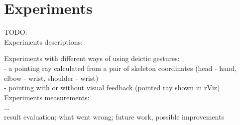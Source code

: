 \chapter{Experiments}
TODO:\\
Experiments descriptions:

Experiments with different ways of using deictic gestures:\\
- a pointing ray calculated from a pair of skeleton coordinates (head - hand, elbow - wrist, shoulder - wrist)\\
- pointing with or without visual feedback (pointed ray shown in rViz)\\

Experiments measurements:\\
...\\

result evaluation; what went wrong; future work, possible improvements 